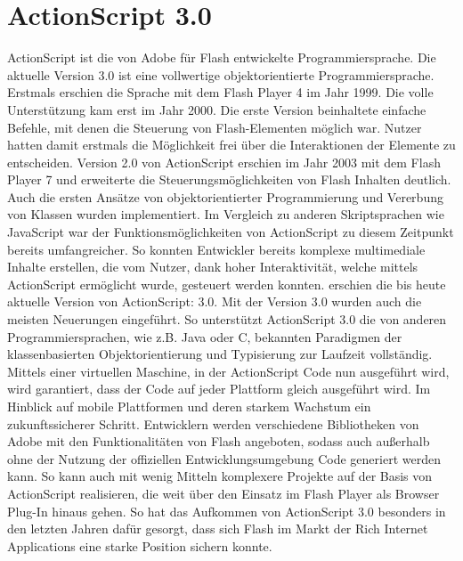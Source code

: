 \section{ActionScript 3.0}
ActionScript ist die von Adobe für Flash entwickelte Programmiersprache.
Die aktuelle Version 3.0 ist eine vollwertige objektorientierte
Programmiersprache.
\newline\newline
Erstmals erschien die Sprache mit dem Flash Player 4 im Jahr 1999. Die
volle Unterstützung kam erst im Jahr 2000. Die erste Version beinhaltete
einfache Befehle, mit denen die Steuerung von Flash-Elementen möglich war.
Nutzer hatten damit erstmals die Möglichkeit frei über die Interaktionen
der Elemente zu entscheiden.
\newline\newline
Version 2.0 von ActionScript erschien im Jahr 2003 mit dem Flash Player 7
und erweiterte die Steuerungsmöglichkeiten von Flash Inhalten deutlich.
Auch die ersten Ansätze von objektorientierter Programmierung und Vererbung
von Klassen wurden implementiert. Im Vergleich zu anderen Skriptsprachen wie
JavaScript war der Funktionsmöglichkeiten von ActionScript zu diesem Zeitpunkt
bereits umfangreicher. So konnten Entwickler bereits komplexe multimediale
Inhalte erstellen, die vom Nutzer, dank hoher Interaktivität, welche mittels
ActionScript ermöglicht wurde, gesteuert werden konnten.
\newline{} erschien die bis heute aktuelle Version von ActionScript: 3.0. Mit der
Version 3.0 wurden auch die meisten Neuerungen eingeführt. So unterstützt
ActionScript 3.0 die von anderen Programmiersprachen, wie z.B. Java oder C,
bekannten Paradigmen der klassenbasierten Objektorientierung und Typisierung
zur Laufzeit vollständig. Mittels einer virtuellen Maschine, in der
ActionScript Code nun ausgeführt wird, wird garantiert, dass der Code auf
jeder Plattform gleich ausgeführt wird. Im Hinblick auf mobile Plattformen
und deren starkem Wachstum ein zukunftssicherer Schritt.
\newline\newline
Entwicklern werden verschiedene Bibliotheken von Adobe mit den
Funktionalitäten von Flash angeboten, sodass auch außerhalb ohne der Nutzung
der offiziellen Entwicklungsumgebung Code generiert werden kann. So kann auch
mit wenig Mitteln komplexere Projekte auf der Basis von ActionScript
realisieren, die weit über den Einsatz im Flash Player als Browser Plug-In
hinaus gehen. So hat das Aufkommen von ActionScript 3.0 besonders in den
letzten Jahren dafür gesorgt, dass sich Flash im Markt der Rich Internet
Applications eine starke Position sichern konnte.

